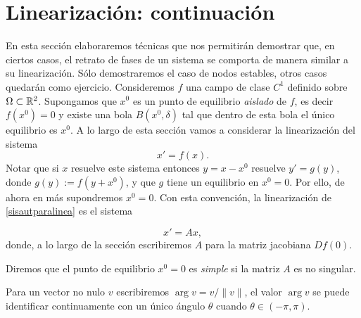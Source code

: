 \section{Linearización: continuación}
En esta sección elaboraremos técnicas que nos permitirán demostrar
que, en ciertos casos, el retrato de fases de un sistema se
comporta de manera similar a su linearización. Sólo demostraremos
el caso de nodos estables, otros casos quedarán como ejercicio.
Consideremos $f$ una campo de clase $C^1$ definido sobre
$\Omega\subset\rr^2$. Supongamos que $x^0$ es un punto de equilibrio
\emph{aislado} de $f$, es decir $f(x^0)=0$ y existe una bola
$B(x^0,\delta)$ tal que dentro de esta bola el único equilibrio es
$x^0$. A lo largo de esta sección vamos a considerar la
linearización del sistema
\begin{equation}\label{sisautparalinea}
    x'=f(x).
\end{equation}
Notar que si $x$ resuelve este sistema entonces $y=x-x^0$ resuelve
$y'=g(y)$, donde $g(y):=f(y+x^0)$, y que $g$ tiene un equilibrio
en $x^0=0$. Por ello, de ahora en más supondremos $x^0=0$. Con
esta convención, la linearización de \eqref{sisautparalinea} es el
sistema


\begin{equation}\label{sisautparalineab}
    x'=Ax,
\end{equation}
donde, a lo largo de la sección escribiremos $A$ para la matriz
jacobiana $Df(0)$.


\begin{definicion} Diremos que el punto de equilibrio $x^0=0$ es
\emph{simple} si la matriz $A$ es no singular.
\end{definicion}

Para un vector no nulo $v$ escribiremos $\arg v=v/\|v\|$, el valor
$\arg v$ se puede identificar continuamente con un único ángulo
$\theta$ cuando $\theta\in (-\pi,\pi)$.

